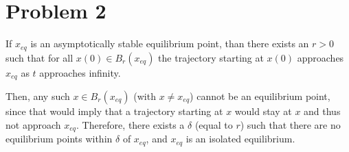 \documentclass{homework}
\begin{document}
\section{Problem 2}

If $x_{eq}$ is an asymptotically stable equilibrium point, than
there exists an $r>0$ such that for all $x(0) \in B_r(x_{eq})$
the trajectory starting at $x(0)$ approaches $x_{eq}$ as $t$ approaches
infinity.

Then, any such $x\in B_r(x_{eq})$ (with $x \neq x_{eq}$) cannot be an
equilibrium point, since that would imply that a trajectory starting at $x$
would stay at $x$ and thus not approach $x_{eq}$. Therefore,
there exists a $\delta$ (equal to $r$) such that there are no
equilibrium points within $\delta$ of $x_{eq}$, and $x_{eq}$ is
an isolated equilibrium.
\end{document}
